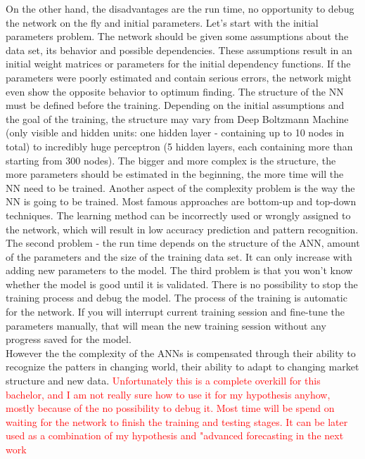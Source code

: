 \documentclass[12pt, a4paper]{article}
\begin{document}
On the other hand, the disadvantages are the run time, no opportunity to debug the network on the fly and initial parameters. Let's start with the initial parameters problem. The network should be given some assumptions about the data set, its behavior and possible dependencies. These assumptions result in an initial weight matrices or parameters for the initial dependency functions. If the parameters were poorly estimated and contain serious errors, the network might even show the opposite behavior to optimum finding. The structure of the NN must be defined before the training. Depending on the initial assumptions and the goal of the training, the structure may vary from Deep Boltzmann Machine (only visible and hidden units: one hidden layer - containing up to 10 nodes in total) to incredibly huge perceptron (5 hidden layers, each containing more than starting from 300 nodes). The bigger and more complex is the structure, the more parameters should be estimated in the beginning, the more time will the NN need to be trained. Another aspect of the complexity problem is the way the NN is going to be trained. Most famous approaches are bottom-up and top-down techniques. The learning method can be incorrectly used or wrongly assigned to the network, which will result in low accuracy prediction and pattern recognition. The second problem - the run time depends on the structure of the ANN, amount of the parameters and the size of the training data set. It can only increase with adding new parameters to the model. The third problem is that you won't know whether the model is good until it is validated. There is no possibility to stop the training process and debug the model. The process of the training is automatic for the network. If you will interrupt current training session and fine-tune the parameters manually, that will mean the new training session without any progress saved for the model.\\
However the the complexity of the ANNs is compensated through their ability to recognize the patters in changing world, their ability to adapt to changing market structure and new data. \textcolor{red}{Unfortunately this is a complete overkill for this bachelor, and I am not really sure how to use it for my hypothesis anyhow, mostly because of the no possibility to debug it. Most time will be spend on waiting for the network to finish the training and testing stages. It can be later used as a combination of my hypothesis and "advanced forecasting in the next work} \\
\end{document}
